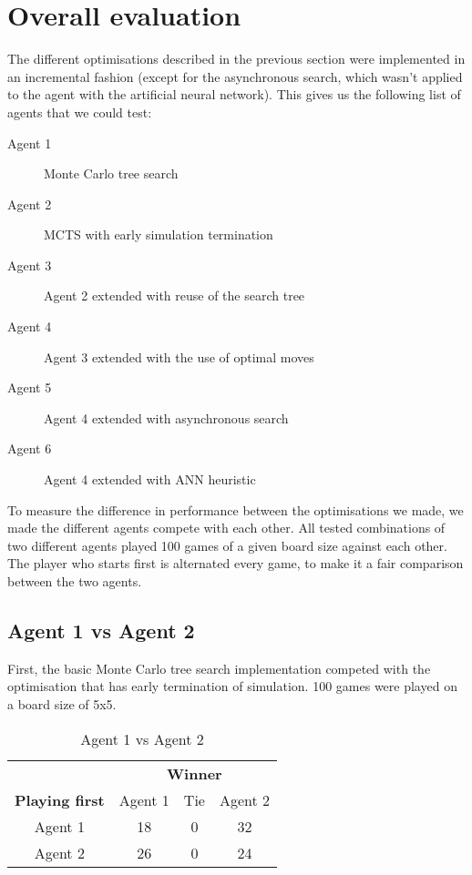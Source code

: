 \section{Overall evaluation}

The different optimisations described in the previous section were implemented in an incremental fashion (except for the asynchronous search, which wasn't applied to the agent with the artificial neural network). This gives us the following list of agents that we could test:
\begin{description}
	\item[Agent 1] Monte Carlo tree search
	\item[Agent 2] MCTS with early simulation termination
	\item[Agent 3] Agent 2 extended with reuse of the search tree
	\item[Agent 4] Agent 3 extended with the use of optimal moves
	\item[Agent 5] Agent 4 extended with asynchronous search
	\item[Agent 6] Agent 4 extended with ANN heuristic
\end{description}

To measure the difference in performance between the optimisations we made, we made the different agents compete with each other. All tested combinations of two different agents played 100 games of a given board size against each other. The player who starts first is alternated every game, to make it a fair comparison between the two agents.

\subsection{Agent 1 vs Agent 2}
First, the basic Monte Carlo tree search implementation competed with the optimisation that has early termination of simulation. 100 games were played on a board size of 5x5.

\begin{table}[!h]
	\centering
	\label{result:Ag1vsAg2}
	\begin{tabular}{c | c | c | c}
		& \multicolumn{3}{c}{\textbf{Winner}}        \\
		\textbf{Playing first} & Agent 1 & Tie & Agent 2 \\ \hline
		Agent 1 & 18 & 0 & 32 \\ \hline
		Agent 2 & 26 & 0 & 24
	\end{tabular}
	\caption{Agent 1 vs Agent 2}
\end{table}

